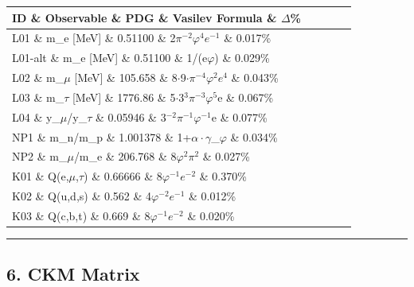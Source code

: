 \begin{tabular}{|l|l|l|l|l|}
\hline
ID \& Observable \& PDG \& Vasilev Formula \& $\Delta$\% \\
\hline
L01 \& m\_e [MeV] \& 0.51100 \& 2$\pi^{-2}\varphi^{4}$$e^{-1}$ \& 0.017\% \\
L01-alt \& m\_e [MeV] \& 0.51100 \& 1/(e$\varphi$) \& 0.029\% \\
L02 \& m\_$\mu$ [MeV] \& 105.658 \& 8$\cdot$9$\cdot\pi^{-4}\varphi^{2}$$e^{4}$ \& 0.043\% \\
L03 \& m\_$\tau$ [MeV] \& 1776.86 \& 5$\cdot$3$^{3}\pi^{-3}\varphi^{5}$e \& 0.067\% \\
L04 \& y\_$\mu$/y\_$\tau$ \& 0.05946 \& 3$^{-2}\pi^{-1}\varphi^{-1}$e \& 0.077\% \\
NP1 \& m\_n/m\_p \& 1.001378 \& 1+$\alpha\cdot\gamma$\_$\varphi$ \& 0.034\% \\
NP2 \& m\_$\mu$/m\_e \& 206.768 \& 8$\varphi^{2}\pi^{2}$ \& 0.027\% \\
K01 \& Q(e,$\mu$,$\tau$) \& 0.66666 \& 8$\varphi^{-1}$$e^{-2}$ \& 0.370\% \\
K02 \& Q(u,d,s) \& 0.562 \& 4$\varphi^{-2}$$e^{-1}$ \& 0.012\% \\
K03 \& Q(c,b,t) \& 0.669 \& 8$\varphi^{-1}$$e^{-2}$ \& 0.020\% \\
\hline
\end{tabular}
\noindent\rule{\textwidth}{0.4pt}

\subsection{6. CKM Matrix}

